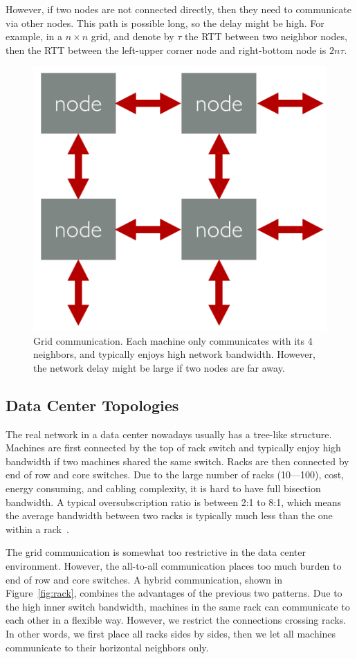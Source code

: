 \documentclass[11pt, twocolumn]{article}
\begin{document}
However, if two nodes are not connected directly, then they need to communicate via
other nodes. This path is possible long,  so the delay might be high. For
example, in a $n\times n$ grid, and denote by $\tau$ the RTT  between
two neighbor nodes, then the RTT between the left-upper corner node and
right-bottom node is $2n\tau$.

\begin{figure}[th!]
  \centering
  \includegraphics[width=.45\textwidth]{fig/grid}
  \caption{Grid communication. Each machine only communicates with its 4
    neighbors, and typically enjoys high network bandwidth. However, the network
  delay might be large if two nodes are far away.}
  \label{fig:grid2}
\end{figure}

\subsection{Data Center Topologies}

The real network in a data
center nowadays usually has a tree-like structure. Machines are first connected
by the top of rack switch and typically enjoy high bandwidth if two machines
shared the same switch. Racks are then connected by end of row and core
switches. Due to the large number of racks (10---100), cost, energy consuming,
and cabling complexity, it is hard to have full bisection bandwidth. A typical
oversubscription ratio is between 2:1 to 8:1, which means the average bandwidth
between two racks is typically much less than the one within a
rack~\cite{AlFLouVah08, BarHol09}.

The grid communication is somewhat too restrictive in the data center environment. However, the all-to-all
communication places too much burden to end of row and core switches. A hybrid
communication, shown in Figure~\ref{fig:rack}, combines the advantages of the
previous two patterns. Due to the high
inner switch bandwidth, machines in the same rack can communicate to each other
in a flexible way. However, we restrict the connections crossing racks. In other
words, we first place all racks sides by sides, then we let all machines
communicate to their horizontal neighbors only.
\end{document}
